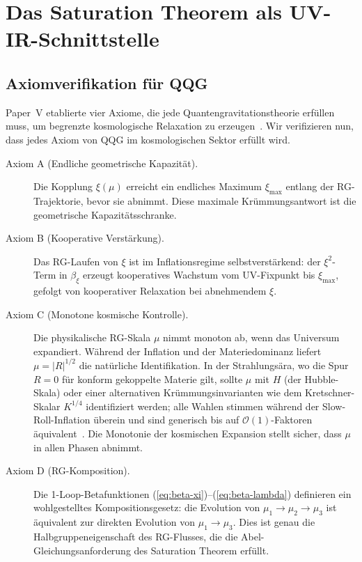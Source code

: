 \documentclass[aps,prd,twocolumn,superscriptaddress,nofootinbib]{revtex4-2}
\begin{document}
\section{Das Saturation Theorem als UV-IR-Schnittstelle}
\label{sec:interface}

\subsection{Axiomverifikation für QQG}

Paper~V etablierte vier Axiome, die jede Quantengravitationstheorie erfüllen muss, um begrenzte kosmologische Relaxation zu erzeugen~\cite{Geiger2026e}. Wir verifizieren nun, dass jedes Axiom von QQG im kosmologischen Sektor erfüllt wird.

\begin{description}
\item[Axiom A (Endliche geometrische Kapazität).] Die Kopplung $\xi(\mu)$ erreicht ein endliches Maximum $\xi_\mathrm{max}$ entlang der RG-Trajektorie, bevor sie abnimmt. Diese maximale Krümmungsantwort ist die geometrische Kapazitätsschranke. \checkmark

\item[Axiom B (Kooperative Verstärkung).] Das RG-Laufen von $\xi$ ist im Inflationsregime selbstverstärkend: der $\xi^2$-Term in $\beta_\xi$ erzeugt kooperatives Wachstum vom UV-Fixpunkt bis $\xi_\mathrm{max}$, gefolgt von kooperativer Relaxation bei abnehmendem $\xi$. \checkmark

\item[Axiom C (Monotone kosmische Kontrolle).] Die physikalische RG-Skala $\mu$ nimmt monoton ab, wenn das Universum expandiert. Während der Inflation und der Materiedominanz liefert $\mu = |R|^{1/2}$ die natürliche Identifikation. In der Strahlungsära, wo die Spur $R = 0$ für konform gekoppelte Materie gilt, sollte $\mu$ mit $H$ (der Hubble-Skala) oder einer alternativen Krümmungsinvarianten wie dem Kretschner-Skalar $K^{1/4}$ identifiziert werden; alle Wahlen stimmen während der Slow-Roll-Inflation überein und sind generisch bis auf $\mathcal{O}(1)$-Faktoren äquivalent~\cite{LiuQuintinAfshordi2026}. Die Monotonie der kosmischen Expansion stellt sicher, dass $\mu$ in allen Phasen abnimmt. \checkmark

\item[Axiom D (RG-Komposition).] Die 1-Loop-Betafunktionen (\ref{eq:beta-xi})--(\ref{eq:beta-lambda}) definieren ein wohlgestelltes Kompositionsgesetz: die Evolution von $\mu_1 \to \mu_2 \to \mu_3$ ist äquivalent zur direkten Evolution von $\mu_1 \to \mu_3$. Dies ist genau die Halbgruppeneigenschaft des RG-Flusses, die die Abel-Gleichungsanforderung des Saturation Theorem erfüllt. \checkmark
\end{description}
\end{document}
